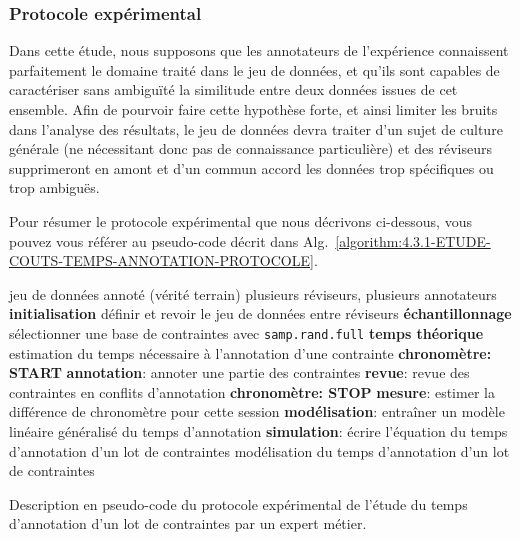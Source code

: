 		\subsubsection{Protocole expérimental}
			
			\begin{leftBarWarning}
				Dans cette étude, nous supposons que les annotateurs de l'expérience connaissent parfaitement le domaine traité dans le jeu de données, et qu'ils sont capables de caractériser sans ambiguïté la similitude entre deux données issues de cet ensemble.
				Afin de pourvoir faire cette hypothèse forte, et ainsi limiter les bruits dans l'analyse des résultats, le jeu de données devra traiter d'un sujet de culture générale (ne nécessitant donc pas de connaissance particulière) et des réviseurs supprimeront en amont et d'un commun accord les données trop spécifiques ou trop ambiguës.
			\end{leftBarWarning}
			
			Pour résumer le protocole expérimental que nous décrivons ci-dessous, vous pouvez vous référer au pseudo-code décrit dans Alg.~\ref{algorithm:4.3.1-ETUDE-COUTS-TEMPS-ANNOTATION-PROTOCOLE}.
			\begin{algorithm}[!htb]
				\begin{algorithmic}[1]
					\Require jeu de données annoté (vérité terrain)
					\Require plusieurs réviseurs, plusieurs annotateurs
					\State \textbf{initialisation} définir et revoir le jeu de données entre réviseurs
					\State \textbf{échantillonnage} sélectionner une base de contraintes avec \texttt{samp.rand.full}
					\State \textbf{temps théorique} estimation du temps nécessaire à l'annotation d'une contrainte
							\State \textbf{chronomètre: START}
							\State \textbf{annotation}: annoter une partie des contraintes
							\State \textbf{revue}: revue des contraintes en conflits d'annotation
							\State \textbf{chronomètre: STOP}
							\State \textbf{mesure}: estimer la différence de chronomètre pour cette session
						\EndWhile
					\EndFor
					\State \textbf{modélisation}: entraîner un modèle linéaire généralisé du temps d'annotation
					\State \textbf{simulation}: écrire l'équation du temps d'annotation d'un lot de contraintes
					\Ensure modélisation du temps d'annotation d'un lot de contraintes
				\end{algorithmic}
				\caption{Description en pseudo-code du protocole expérimental de l'étude du temps d'annotation d'un lot de contraintes par un expert métier.}
				\label{algorithm:4.3.1-ETUDE-COUTS-TEMPS-ANNOTATION-PROTOCOLE}
			\end{algorithm}
			
